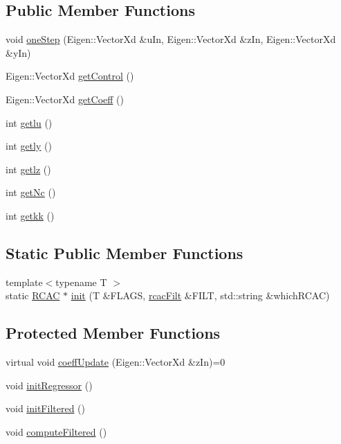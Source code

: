 \subsection*{Public Member Functions}
\begin{DoxyCompactItemize}
\item 
void \hyperlink{class_r_c_a_c_a956bb6a557f050d3808d5392fd3add20}{one\+Step} (Eigen\+::\+Vector\+Xd \&u\+In, Eigen\+::\+Vector\+Xd \&z\+In, Eigen\+::\+Vector\+Xd \&y\+In)
\item 
Eigen\+::\+Vector\+Xd \hyperlink{class_r_c_a_c_ad93e5753d1810d7c3b2f6fbf56857a51}{get\+Control} ()
\item 
Eigen\+::\+Vector\+Xd \hyperlink{class_r_c_a_c_a5223fc3dbd1a3b4b1577dfd83af76f7e}{get\+Coeff} ()
\item 
int \hyperlink{class_r_c_a_c_ae854b722c35cb1d8506ddacf6a89f795}{getlu} ()
\item 
int \hyperlink{class_r_c_a_c_a1066229fd21de368018ae43747f34622}{getly} ()
\item 
int \hyperlink{class_r_c_a_c_a80a0a753247f22bea53bc5c0b76403a1}{getlz} ()
\item 
int \hyperlink{class_r_c_a_c_a5e3d7aedab3b39415315f1c6b1920ef0}{get\+Nc} ()
\item 
int \hyperlink{class_r_c_a_c_a4e710eaf32fac967dc76a8d851a51211}{getkk} ()
\end{DoxyCompactItemize}
\subsection*{Static Public Member Functions}
\begin{DoxyCompactItemize}
\item 
{\footnotesize template$<$typename T $>$ }\\static \hyperlink{class_r_c_a_c}{R\+C\+AC} $\ast$ \hyperlink{class_r_c_a_c_af7b7133b676886d5010be725291c1a1d}{init} (T \&F\+L\+A\+GS, \hyperlink{structrcac_filt}{rcac\+Filt} \&F\+I\+LT, std\+::string \&which\+R\+C\+AC)
\end{DoxyCompactItemize}
\subsection*{Protected Member Functions}
\begin{DoxyCompactItemize}
\item 
virtual void \hyperlink{class_r_c_a_c_a5ac60fc4b359cf5555427bd1652d6ca1}{coeff\+Update} (Eigen\+::\+Vector\+Xd \&z\+In)=0
\item 
void \hyperlink{class_r_c_a_c_a8dd38159eccbe85cbee4118020c90c88}{init\+Regressor} ()
\item 
void \hyperlink{class_r_c_a_c_aac17e469acf0f2457941d18ae02bfe07}{init\+Filtered} ()
\item 
void \hyperlink{class_r_c_a_c_a5e6bc7050ced3b1be7d9060d089dccfb}{compute\+Filtered} ()
\end{DoxyCompactItemize}
